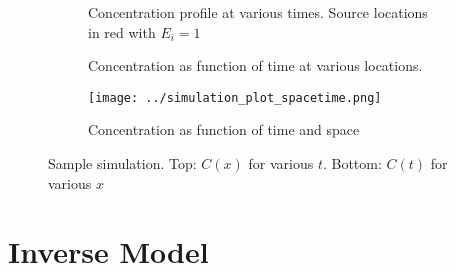 \documentclass[]{article}
\begin{document}
\begin{figure}[h]
	\begin{center}
		\begin{subfigure}[b]{\textwidth}
			\centering
			
			\caption{Concentration profile at various times. Source locations in red with $E_i = 1$}
			\label{fig:simulation_plot_space}
		\end{subfigure}%
		
		\begin{subfigure}[b]{\textwidth}
			\centering
			
			\caption{Concentration as function of time at various locations.}
			\label{fig:simulation_plot_time}
		\end{subfigure}
		\begin{subfigure}[b]{\textwidth}
			\centering
			\texttt{[image: ../simulation\_plot\_spacetime.png]}
			\caption{Concentration as function of time and space}
			\label{fig:simulation_plot_spacetime}
		\end{subfigure}
		\caption{Sample simulation. Top: $C(x)$ for various $t$. Bottom: $C(t)$ for various $x$}
		\label{fig:fig simulation}
	\end{center}
\end{figure}

\clearpage
\section{Inverse Model}
\end{document}
